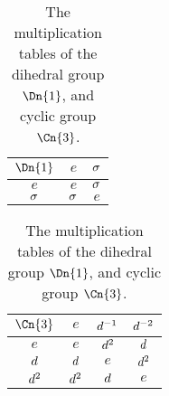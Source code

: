 
\begin{table}[h]
  \caption[ The multiplication tables of the $\Dn{1}$ and $\Cn{3}$]{
    The multiplication tables of the
    dihedral group $\Dn{1}$, and
    cyclic group $\Cn{3}$.
  }
  \label{tab:C3MultTab}
  \begin{center}
    \centering
    \begin{tabular}{c | c c}
      $\Dn{1}$         & $e$        & $\sigma$  \\ \hline
      $e$              & $e$        & $\sigma$   \\
      $\sigma$ & $\sigma$  & $e$         \\
    \end{tabular}
    \qquad\qquad
    \begin{tabular}{c | c c c}
      $\Cn{3}$         & $e$        & $d^{-1}$ & $d^{-2}$ \\ \hline
      $e$              & $e$        & $d^2$ & $d$  \\
      $d$ & $d$  & $e$       & $d^2$   \\
      $d^2$ & $d^2$  & $d$ & $e$
    \end{tabular}
  \end{center}
\end{table}

